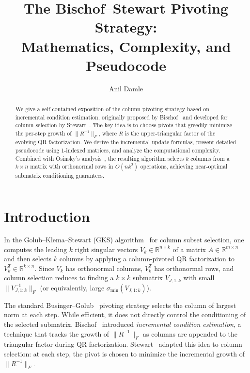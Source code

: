 \documentclass[11pt]{article}
\title{The Bischof--Stewart Pivoting Strategy:\\Mathematics, Complexity, and Pseudocode}
\author{Anil Damle}
\date{}
\theoremstyle{definition}
\theoremstyle{remark}
\newcommand{\R}{\mathbb{R}}
\newcommand{\smin}{\sigma_{\min}}
\newcommand{\fnorm}[1]{\lVert #1 \rVert_F}
\begin{document}
\maketitle

\begin{abstract}
We give a self-contained exposition of the column pivoting strategy
based on incremental condition estimation, originally proposed by
Bischof~\cite{bischof1990incremental} and developed for column selection
by Stewart~\cite{stewart1998incremental}.  The key idea is to choose
pivots that greedily minimize the per-step growth of
$\fnorm{R^{-1}}$, where $R$ is the upper-triangular factor of the
evolving QR factorization.  We derive the incremental update formulas,
present detailed pseudocode using 1-indexed matrices, and analyze the
computational complexity.  Combined with Osinsky's
analysis~\cite{osinsky2025close}, the resulting algorithm selects $k$
columns from a $k \times n$ matrix with orthonormal rows in $O(nk^2)$
operations, achieving near-optimal submatrix conditioning guarantees.
\end{abstract}

\section{Introduction}
\label{sec:intro}

In the Golub--Klema--Stewart (GKS)
algorithm~\cite{golub_klema_stewart} for column subset selection, one
computes the leading $k$ right singular vectors $V_k \in \R^{n \times
k}$ of a matrix $A \in \R^{m \times n}$ and then selects $k$ columns
by applying a column-pivoted QR factorization to $V_k^T \in \R^{k
\times n}$.  Since $V_k$ has orthonormal columns, $V_k^T$ has
orthonormal rows, and column selection reduces to finding a $k \times
k$ submatrix $V_{J,1:k}$ with small $\fnorm{V_{J,1:k}^{-1}}$ (or
equivalently, large $\smin(V_{J,1:k})$).

The standard Businger--Golub~\cite{businger_linear_least_squares}
pivoting strategy selects the column of largest norm at each step.
While efficient, it does not directly control the conditioning of the
selected submatrix.  Bischof~\cite{bischof1990incremental} introduced
\emph{incremental condition estimation}, a technique that tracks the
growth of $\fnorm{R^{-1}}$ as columns are appended to the triangular
factor during QR factorization.
Stewart~\cite{stewart1998incremental} adapted this idea to column
selection: at each step, the pivot is chosen to minimize the
incremental growth of $\fnorm{R^{-1}}$.
\end{document}
